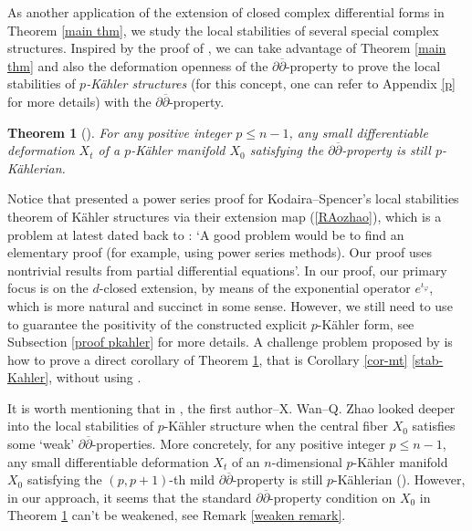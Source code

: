 \documentclass[12pt]{amsart}
\numberwithin{equation}{section}
\theoremstyle{definition}
\theoremstyle{definition}
\theoremstyle{definition}
\renewcommand{\1}{\mathsf{1}}
\newcommand{\db}{\overline{\partial}}
\renewcommand{\>}{\rightarrow}
\newcommand{\p}{\partial}
\newcommand{\bp}{\overline\partial}
\def\p{\partial}
\def\v{\varphi}
\theoremstyle{plain} %
\newtheorem{bigthm}{Theorem}
\theoremstyle{plain} %
\theoremstyle{plain} %
\begin{document}
	As another application of the extension of closed complex differential forms in Theorem \ref{main thm}, we study the local stabilities of several special complex structures. Inspired by the proof of \cite[Theorem 9.23]{Vo02}, we can take advantage of Theorem \ref{main thm}  and also the deformation openness of the $\p\bp$-property to prove the local stabilities of \textit{$p$-K\"{a}hler structures} (for this concept, one can refer to Appendix \ref{p} for more details) with the  $\p\bp$-property.
	
	
	\begin{bigthm}[{\cite[Theorem 4.9]{RWZ21}}]\label{pkahler introduction}
		For any positive integer $p\leq n-1$, any
		small differentiable deformation $X_t$ of a
		$p$-K\"ahler manifold $X_0$ satisfying the $\p\db$-property is still
		$p$-K\"ahlerian.
	\end{bigthm}
	

	Notice that \cite{RWZ21} presented a power series proof for Kodaira--Spencer's local stabilities theorem of K\"{a}hler structures via their extension map (\ref{RAozhao}), which is a problem at latest dated back to \cite[Remark 1 on p. 180]{MK71}: 	`A
	good problem would be to find an elementary proof (for example,
	using power series methods). Our proof uses nontrivial results from
	partial differential equations'. In our proof, our primary focus is on the $d$-closed extension, by means of the exponential operator $e^{\iota_\v}$, which is more natural and succinct in some sense. However, we still need to use \cite[Theorem 7]{KS60} to guarantee the positivity of the constructed explicit $p$-K\"ahler form, see Subsection \ref{proof pkahler} for more details. A challenge problem proposed by \cite{WZ20} is how to prove
	a direct corollary of Theorem \ref{pkahler introduction}, that is Corollary \ref{cor-mt} \eqref{stab-Kahler},  without using \cite[Theorem 7] {KS60}.
	
	It is worth mentioning that in \cite{RWZ19}, the first author--X. Wan--Q. Zhao looked deeper into the local stabilities of $p$-K\"{a}hler structure when the central fiber $X_0$ satisfies some `weak' $\p\bp$-properties. More concretely, for any positive integer $p\leq n-1$, any
	small differentiable deformation $X_t$ of  an $n$-dimensional
	$p$-K\"ahler manifold $X_0$ satisfying  the
	$(p,p+1)$-th mild $\p\db$-property is still
	$p$-K\"ahlerian (\cite[Theorem 1.1]{RWZ19}). However, in our approach, it seems that  the standard $\p\bp$-property condition on $X_0$ in Theorem \ref{pkahler introduction} can't be weakened, see Remark \ref{weaken remark}.
	
\end{document}

